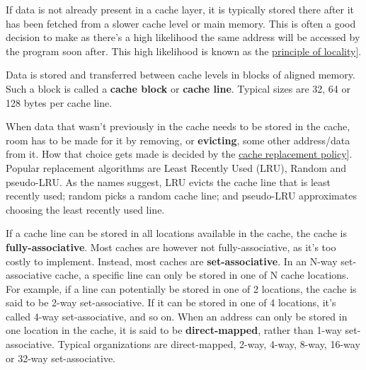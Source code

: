 \documentclass[
  a4paper,
]{report}
\begin{document}
If data is not already present in a cache layer, it is typically stored
there after it has been fetched from a slower cache level or main
memory. This is often a good decision to make as there's a high
likelihood the same address will be accessed by the program soon after.
This high likelihood is known as the
\href{https://en.wikipedia.org/wiki/Locality_of_reference}{\label{__index_entry_113}{principle
of
locality}}{]}\label{__index_entry_114}{}.

Data is stored and transferred between cache levels in blocks of aligned
memory. Such a block is called a
\textbf{\label{__index_entry_115}{cache
block}} or
\textbf{\label{__index_entry_116}{cache
line}}. Typical sizes are 32, 64 or 128 bytes per
cache line.

When data that wasn't previously in the cache needs to be stored in the
cache, room has to be made for it by removing, or
\textbf{\label{__index_entry_117}{evicting}},
some other address/data from it. How that choice gets made is decided by
the
\href{https://en.wikipedia.org/wiki/Cache_replacement_policies}{\label{__index_entry_118}{cache
replacement policy}}{]}. Popular
replacement algorithms are
\label{__index_entry_119}{Least Recently Used
(LRU)},
\label{__index_entry_120}{Random}
and
\label{__index_entry_121}{pseudo-LRU}.
As the names suggest, LRU evicts the cache line that is least recently
used; random picks a random cache line; and pseudo-LRU approximates
choosing the least recently used line.

If a cache line can be stored in all locations available in the cache,
the cache is
\textbf{\label{__index_entry_122}{fully-associative}}.
Most caches are however not fully-associative, as it's too costly to
implement. Instead, most caches are
\textbf{\label{__index_entry_123}{set-associative}}.
In an N-way set-associative cache, a specific line can only be stored in
one of N cache locations. For example, if a line can potentially be
stored in one of 2 locations, the cache is said to be 2-way
set-associative. If it can be stored in one of 4 locations, it's called
4-way set-associative, and so on. When an address can only be stored in
one location in the cache, it is said to be
\textbf{\label{__index_entry_124}{direct-mapped}},
rather than 1-way set-associative. Typical organizations are
direct-mapped, 2-way, 4-way, 8-way, 16-way or 32-way set-associative.
\end{document}
